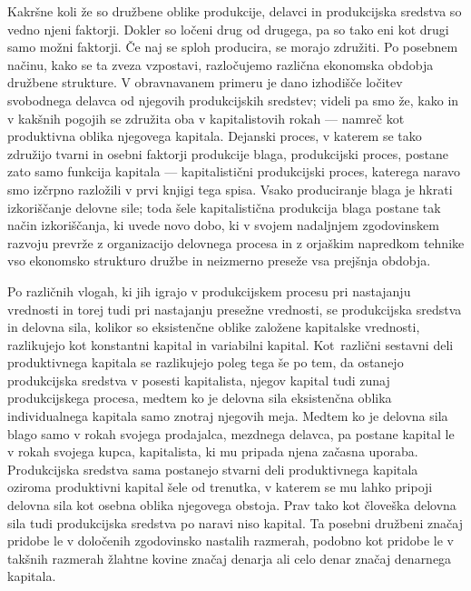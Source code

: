 \documentclass[kapital_02.tex]{subfiles}
\begin{document}
Kakršne koli že so družbene oblike produkcije, delavci in produkcijska sredstva so vedno njeni faktorji. Dokler so ločeni drug od drugega, pa so tako eni kot drugi samo možni faktorji. Če naj se sploh producira, se morajo združiti. Po posebnem načinu, kako se ta zveza vzpostavi, razločujemo različna ekonomska obdobja družbene strukture. V obravnavanem primeru je dano izhodišče ločitev svobodnega delavca od njegovih produkcijskih sredstev; videli pa smo že, kako in v kakšnih pogojih se združita oba v kapitalistovih rokah --- namreč kot produktivna oblika njegovega kapitala. Dejanski proces, v katerem se tako združijo tvarni in osebni faktorji produkcije blaga, produkcijski proces, postane zato samo funkcija kapitala --- kapitalistični produkcijski proces, katerega naravo smo izčrpno razložili v prvi knjigi tega spisa. Vsako produciranje blaga je hkrati izkoriščanje delovne sile; toda šele kapitalistična produkcija blaga postane tak način izkoriščanja, ki uvede novo dobo, ki v svojem nadaljnjem zgodovinskem razvoju prevrže z organizacijo delovnega procesa in z orjaškim napredkom tehnike vso ekonomsko strukturo družbe in neizmerno preseže vsa prejšnja obdobja.

Po različnih vlogah, ki jih igrajo v produkcijskem procesu pri nastajanju vrednosti in torej tudi pri nastajanju presežne vrednosti, se produkcijska sredstva in delovna sila, kolikor so eksistenčne oblike založene kapitalske vrednosti, razlikujejo kot konstantni kapital in variabilni kapital. Kot\KPEstran\ različni sestavni deli produktivnega kapitala se razlikujejo poleg tega še po tem, da ostanejo produkcijska sredstva v posesti kapitalista, njegov kapital tudi zunaj produkcijskega procesa, medtem ko je delovna sila eksistenčna oblika individualnega kapitala samo znotraj njegovih meja. Medtem ko je delovna sila blago samo v rokah svojega prodajalca, mezdnega delavca, pa postane kapital le v rokah svojega kupca, kapitalista, ki mu pripada njena začasna uporaba. Produkcijska sredstva sama postanejo stvarni deli produktivnega kapitala oziroma produktivni kapital šele od trenutka, v katerem se mu lahko pripoji delovna sila kot osebna oblika njegovega obstoja. Prav tako kot človeška delovna sila tudi produkcijska sredstva po naravi niso kapital. Ta posebni družbeni značaj pridobe le v določenih zgodovinsko nastalih razmerah, podobno kot pridobe le v takšnih razmerah žlahtne kovine značaj denarja ali celo denar značaj denarnega kapitala.
\end{document}
